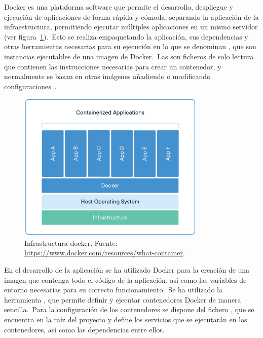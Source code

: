 
Docker es una plataforma software que permite el desarrollo, despliegue y ejecución de aplicaciones de forma rápida y
cómoda, separando la aplicación de la infraestructura, permitiendo ejecutar múltiples aplicaciones en un mismo servidor
(ver figura~\ref{fig:docker-container-infrastructure}).\ Esto se realiza empaquetando la
aplicación, sus dependencias y otras herramientas necesarias para su ejecución en lo que se denominan
, que son instancias ejecutables de una imagen de Docker.\ Las  son
ficheros de solo lectura que contienen las instrucciones necesarias para crear un contenedor, y normalmente se basan
en otras imágenes añadiendo o modificando configuraciones~\cite{docker-docs}.

\begin{figure}[ht]
	\centering
	\includegraphics[width=0.8\textwidth]{res/images/container-what-is-container}
	\caption{Infrastructura docker. Fuente: \url{https://www.docker.com/resources/what-container}.}
	\label{fig:docker-container-infrastructure}
\end{figure}

En el desarrollo de la aplicación se ha utilizado Docker para la creación de una imagen que contenga todo el código de
la aplicación, así como las variables de entorno necesarias para su correcto funcionamiento.\ Se ha
utilizado la herramienta , que permite definir y ejecutar contenedores Docker de manera
sencilla.\ Para la configuración de los contenedores se dispone del fichero , que se
encuentra en la raíz del proyecto y define los servicios que se ejecutarán en los contenedores, así como
las dependencias entre ellos.

